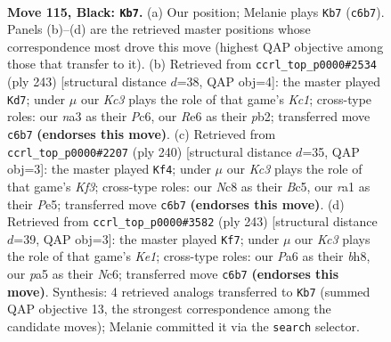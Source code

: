 \documentclass[11pt]{article}
\begin{document}
\clearpage

\begin{figure}[p]\centering
\begin{subfigure}{0.46\textwidth}\centering
\resizebox{\linewidth}{!}{%
\newchessgame
\chessboard[
  setfen={2n4K/8/p1k1r3/P4p1p/5B2/N5P1/6b1/R7 b - - 41 115},
  showmover=false,
  pgfstyle=straightmove, color=movearrow, markmove={c6-b7}
]}
\caption{}
\end{subfigure}\hfill
\begin{subfigure}{0.46\textwidth}\centering
\resizebox{\linewidth}{!}{%
\newchessgame
\chessboard[
  setfen={2k5/8/p1p1n1p1/8/P3P2P/3K4/1P5B/8 b - - 44 122},
  showmover=false,
  pgfstyle=straightmove, color=movearrow, markmove={c8-d7}
]}
\caption{}
\end{subfigure}
\\[4pt]
\begin{subfigure}{0.46\textwidth}\centering
\resizebox{\linewidth}{!}{%
\newchessgame
\chessboard[
  setfen={8/7p/4p1b1/2B1P1P1/p7/P1k2K2/8/8 w - - 3 121},
  showmover=false,
  pgfstyle=straightmove, color=movearrow, markmove={f3-f4}
]}
\caption{}
\end{subfigure}\hfill
\begin{subfigure}{0.46\textwidth}\centering
\resizebox{\linewidth}{!}{%
\newchessgame
\chessboard[
  setfen={4k2B/8/2n3p1/1R3p2/7P/5PP1/3r4/5K2 b - - 30 122},
  showmover=false,
  pgfstyle=straightmove, color=movearrow, markmove={e8-f7}
]}
\caption{}
\end{subfigure}
\caption{\textbf{Move 115, Black: \texttt{Kb7}.} (a) Our position; Melanie plays \texttt{Kb7} (\texttt{c6b7}). Panels (b)--(d) are the retrieved master positions whose correspondence most drove this move (highest QAP objective among those that transfer to it). (b) Retrieved from \texttt{ccrl\_top\_p0000\#2534} (ply 243) [structural distance $d$=38, QAP obj=4]: the master played \texttt{Kd7}; under $\mu$ our \emph{Kc3} plays the role of that game's \emph{Kc1}; cross-type roles: our \emph{n}a3 as their \emph{P}c6, our \emph{R}e6 as their \emph{p}b2; transferred move \texttt{c6b7} \textbf{(endorses this move)}. (c) Retrieved from \texttt{ccrl\_top\_p0000\#2207} (ply 240) [structural distance $d$=35, QAP obj=3]: the master played \texttt{Kf4}; under $\mu$ our \emph{Kc3} plays the role of that game's \emph{Kf3}; cross-type roles: our \emph{N}c8 as their \emph{B}c5, our \emph{r}a1 as their \emph{P}e5; transferred move \texttt{c6b7} \textbf{(endorses this move)}. (d) Retrieved from \texttt{ccrl\_top\_p0000\#3582} (ply 243) [structural distance $d$=39, QAP obj=3]: the master played \texttt{Kf7}; under $\mu$ our \emph{Kc3} plays the role of that game's \emph{Ke1}; cross-type roles: our \emph{P}a6 as their \emph{b}h8, our \emph{p}a5 as their \emph{N}c6; transferred move \texttt{c6b7} \textbf{(endorses this move)}. Synthesis: 4 retrieved analogs transferred to \texttt{Kb7} (summed QAP objective 13, the strongest correspondence among the candidate moves); Melanie committed it via the \texttt{search} selector.}
\label{fig:thought-m229}
\end{figure}
\end{document}
